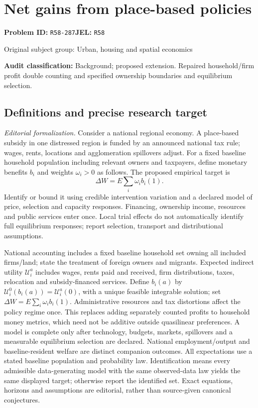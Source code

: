 \documentclass[11pt,a4paper]{article}
\begin{document}
\section*{Net gains from place-based policies}
\textbf{Problem ID:} \texttt{R58-287}\quad \textbf{JEL:} \texttt{R58}\par
\label{problem:OP-0467}
{\sffamily\small\color{muted}Original subject group: Urban, housing and spatial economics\par}
\label{definitions:problem:30007749}
\textbf{Audit classification:} Background; proposed extension. Repaired household/firm profit double counting and specified ownership boundaries and equilibrium selection.
\subsection*{Definitions and precise research target}
\textit{Editorial formalization.} Consider a national regional economy. A place-based subsidy in one distressed region is funded by an announced national tax rule; wages, rents, locations and agglomeration spillovers adjust. For a fixed baseline household population including relevant owners and taxpayers, define monetary benefits \(b_i\) and weights \(\omega_i>0\) as follows. The proposed empirical target is \[\Delta W=E\sum_i\omega_i b_i(1).\] Identify or bound it using credible intervention variation and a declared model of price, selection and capacity responses. Financing, ownership income, resources and public services enter once. Local trial effects do not automatically identify full equilibrium responses; report selection, transport and distributional assumptions.

National accounting includes a fixed baseline household set owning all included firms/land; state the treatment of foreign owners and migrants. Expected indirect utility \(\mathcal U_i^a\) includes wages, rents paid and received, firm distributions, taxes, relocation and subsidy-financed services. Define \(b_i(a)\) by \(\mathcal U_i^0(b_i(a))=\mathcal U_i^a(0)\), with a unique feasible integrable solution; set \(\Delta W=E\sum_i\omega_i b_i(1)\). Administrative resources and tax distortions affect the policy regime once. This replaces adding separately counted profits to household money metrics, which need not be additive outside quasilinear preferences. A model is complete only after technology, budgets, markets, spillovers and a measurable equilibrium selection are declared. National employment/output and baseline-resident welfare are distinct companion outcomes. All expectations use a stated baseline population and probability law. Identification means every admissible data-generating model with the same observed-data law yields the same displayed target; otherwise report the identified set. Exact equations, horizons and assumptions are editorial, rather than source-given canonical conjectures.
\end{document}
